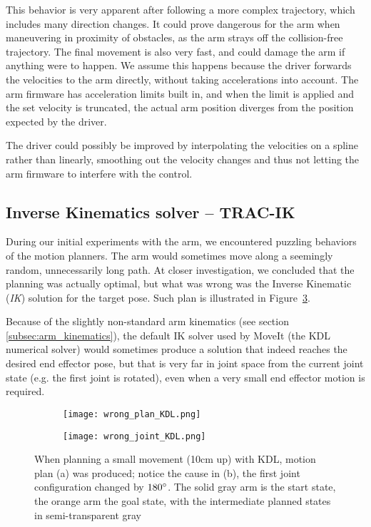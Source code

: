 \documentclass[buriama8_dp.tex]{subfiles}
\begin{document}
This behavior is very apparent after following a more complex trajectory, which includes many direction changes. It could prove dangerous for the arm when maneuvering in proximity of obstacles, as the arm strays off the collision-free trajectory. The final movement is also very fast, and could damage the arm if anything were to happen. We assume this happens because the driver forwards the velocities to the arm directly, without taking accelerations into account. The arm firmware has acceleration limits built in, and when the limit is applied and the set velocity is truncated, the actual arm position diverges from the position expected by the driver.

The driver could possibly be improved by interpolating the velocities on a spline rather than linearly, smoothing out the velocity changes and thus not letting the arm firmware to interfere with the control.

\subsection{Inverse Kinematics solver -- TRAC-IK}
\label{subsec:tracik}

During our initial experiments with the arm, we encountered puzzling behaviors of the motion planners. The arm would sometimes move along a seemingly random, unnecessarily long path. At closer investigation, we concluded that the planning was actually optimal, but what was wrong was the Inverse Kinematic (\emph{IK}) solution for the target pose. Such plan is illustrated in Figure~\ref{fig:wrong_planning}.

Because of the slightly non-standard arm kinematics (see section \ref{subsec:arm_kinematics}), the default IK solver used by MoveIt (the KDL numerical solver) would sometimes produce a solution that indeed reaches the desired end effector pose, but that is very far in joint space from the current joint state (e.g. the first joint is rotated), even when a very small end effector motion is required.

\begin{figure}[htp]
  \centering
  \begin{subfigure}[t]{0.49\textwidth}
    \texttt{[image: wrong\_plan\_KDL.png]}
    \caption{}
    \label{fig:wron_plan}
  \end{subfigure}
  \begin{subfigure}[t]{0.49\textwidth}
    \texttt{[image: wrong\_joint\_KDL.png]}
    \caption{}
    \label{fig:wrong_joint}
  \end{subfigure}

  \caption[Non-optimal motion plan]{When planning a small movement (10cm up) with KDL, motion plan (a) was produced; notice the cause in (b), the first joint configuration changed by \(180^\circ\). The solid gray arm is the start state, the orange arm the goal state, with the intermediate planned states in semi-transparent gray}
  \label{fig:wrong_planning}
\end{figure}
\end{document}
